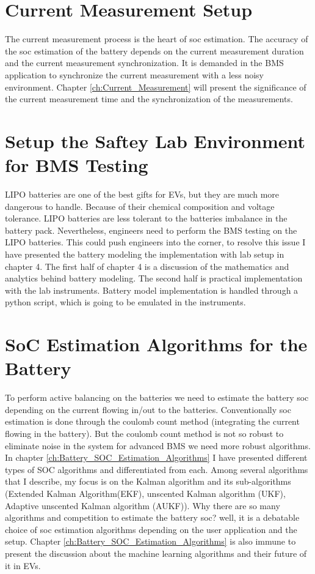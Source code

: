 \section*{Current Measurement Setup }
The current measurement process is the heart of soc estimation. The accuracy of the soc estimation of the battery depends on the current measurement duration and the current measurement synchronization. It is demanded in the BMS application to synchronize the current measurement with a less noisy environment. Chapter \ref{ch:Current_Measurement} will present the significance of the current measurement time and the synchronization of the measurements.

\section*{Setup the Saftey Lab Environment for BMS Testing}
LIPO batteries are one of the best gifts for EVs, but they are much more dangerous to handle. Because of their chemical composition and voltage tolerance. LIPO batteries are less tolerant to the batteries imbalance in the battery pack. Nevertheless, engineers need to perform the BMS testing on the LIPO batteries. This could push engineers into the corner, to resolve this issue I have presented the battery modeling the implementation with lab setup in chapter 4. The first half of chapter 4 is a discussion of the mathematics and analytics behind battery modeling. The second half is practical implementation with the lab instruments.
Battery model implementation is handled through a python script, which is going to be emulated in the instruments.

\section*{SoC Estimation Algorithms for the Battery}
To perform active balancing on the batteries we need to estimate the battery soc depending on the current flowing in/out to the batteries. Conventionally soc estimation is done through the coulomb count method (integrating the current flowing in the battery). But the coulomb count method is not so robust to eliminate noise in the system for advanced BMS we need more robust algorithms. In chapter \ref{ch:Battery_SOC_Estimation_Algorithms} I have presented different types of SOC algorithms and differentiated from each. Among several algorithms that I describe, my focus is on the Kalman algorithm and its sub-algorithms (Extended Kalman Algorithm(EKF), unscented Kalman algorithm (UKF), Adaptive unscented Kalman algorithm (AUKF)). Why there are so many algorithms and competition to estimate the battery soc? well, it is a debatable choice of soc estimation algorithms depending on the user application and the setup. Chapter \ref{ch:Battery_SOC_Estimation_Algorithms} is also immune to present the discussion about the machine learning algorithms and their future of it in EVs.